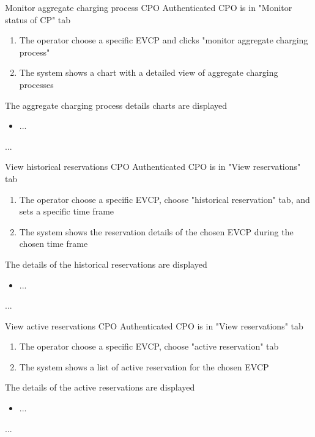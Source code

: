 \usecase
{Monitor aggregate charging process} %
{CPO} %
{Authenticated CPO is in "Monitor status of CP" tab} %
{ %
    \begin{enumerate}
        \item The operator choose a specific EVCP and clicks "monitor aggregate charging process"
        \item The system shows a chart with a detailed view of aggregate charging processes
    \end{enumerate}
}
{The aggregate charging process details charts are displayed} %
{ %
    \begin{itemize}
        \item ...
    \end{itemize}
}
{ %
...
}

\usecase
{View historical reservations} %
{CPO} %
{Authenticated CPO is in "View reservations" tab} %
{ %
    \begin{enumerate}
        \item The operator choose a specific EVCP, choose "historical reservation" tab, and sets a specific time frame
        \item The system shows the reservation details of the chosen EVCP during the chosen time frame
    \end{enumerate}
}
{The details of the historical reservations are displayed} %
{ %
    \begin{itemize}
        \item ...
    \end{itemize}
}
{ %
...
}

\usecase
{View active reservations} %
{CPO} %
{Authenticated CPO is in "View reservations" tab} %
{ %
    \begin{enumerate}
        \item The operator choose a specific EVCP, choose "active reservation" tab
        \item The system shows a list of active reservation for the chosen EVCP
    \end{enumerate}
}
{The details of the active reservations are displayed} %
{ %
    \begin{itemize}
        \item ...
    \end{itemize}
}
{ %
...
}

